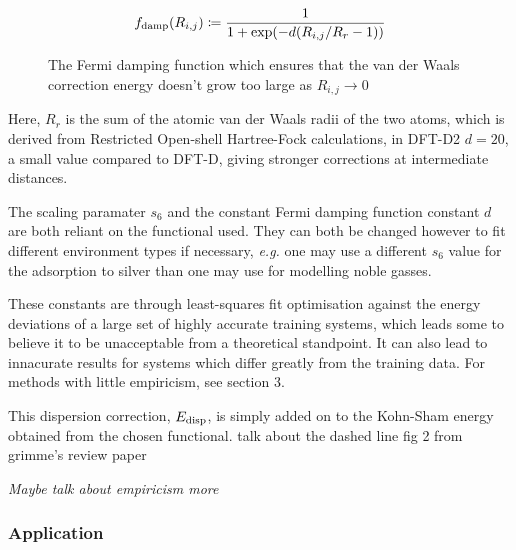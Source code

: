 \documentclass[10pt,a4paper,twocolumn,twoside]{extarticle}
\begin{document}
	\begin{align} \label{eq:damp}
		f_{\rm damp}(R_{i,j}) \coloneqq \frac{1}{1+\exp(-d(R_{i,j}/R_r -1))}
	\end{align}
	\begin{figure}
		\caption{The Fermi damping function which ensures that the van der Waals correction energy doesn't grow too large as $R_{i,j} \rightarrow 0$}
		\label{fig:Fermi}
	\end{figure}
	Here, $R_r$ is the sum of the atomic van der Waals radii of the two atoms, which is derived from Restricted Open-shell Hartree-Fock calculations, in DFT-D2 $d = 20$, a small value compared to DFT-D, giving stronger corrections at intermediate distances. 

	The scaling paramater $s_6$ and the constant Fermi damping function constant $d$ are both reliant on the functional used. They can both be changed however to fit different environment types if necessary, \emph{e.g.} one may use a different $s_6$ value for the adsorption to silver\cite{Schiavo2018} than one may use for modelling noble gasses.  

	These constants are through least-squares fit optimisation against the energy deviations of a large set of highly accurate training systems, which leads some to believe it to be unacceptable from a theoretical standpoint. It can also lead to innacurate results for systems which differ greatly from the training data.\cite{Sato2009}\cite{Grimme2010}\cite{Jones2015} For methods with little empiricism, see section 3.

	This dispersion correction, $E_{\rm disp}$, is simply added on to the Kohn-Sham energy obtained from the chosen functional.
	\color{red}talk about the dashed line fig 2 from grimme's review paper \color{black}

	\emph{Maybe talk about empiricism more}
	\subsubsection{Application}
\end{document}
